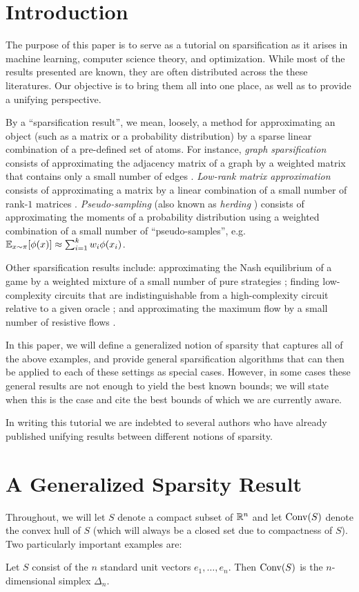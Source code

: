 \documentclass[paper.tex]{subfiles}
\begin{document}
\section{Introduction} 
\label{sec:intro}

The purpose of this paper is to serve as a tutorial on sparsification as it arises 
in machine learning, computer science theory, and optimization. While most of the 
results presented are known, they are often distributed across the these 
literatures. Our objective is to bring them all into one place, 
as well as to provide a unifying perspective.

By a ``sparsification result'', we mean, loosely, a method for approximating an 
object (such as a matrix or a probability distribution) by a sparse linear 
combination of a pre-defined set of atoms. For instance, \emph{graph 
sparsification} consists of approximating the adjacency matrix of a graph by a 
weighted matrix that contains only a small number of edges \cite{?}. 
\emph{Low-rank matrix approximation} consists of approximating a matrix by a 
linear combination of a small number of rank-$1$ matrices \cite{?}. 
\emph{Pseudo-sampling} (also known as \emph{herding} \cite{?}) consists of 
approximating the moments of a probability distribution using a weighted 
combination of a small number of ``pseudo-samples'', e.g. 
$\mathbb{E}_{x \sim \pi}[\phi(x)] \approx \sum_{i=1}^k w_i \phi(x_i)$.

Other sparsification results include:  approximating the 
Nash equilibrium of a game by a weighted mixture of a small number of pure 
strategies \cite{?}; finding low-complexity circuits that are indistinguishable 
from a high-complexity circuit relative to a given oracle \cite{?}; and 
approximating the maximum flow by a small number of resistive flows \cite{?}.

In this paper, we will define a generalized notion of sparsity that captures 
all of the above examples, and provide general sparsification algorithms that 
can then be applied to each of these settings as special cases. However, in some 
cases these general results are not enough to yield the best known bounds; we will 
state when this is the case and cite the best bounds of which we are currently 
aware.

In writing this tutorial we are indebted to several authors who have already 
published unifying results between different notions of sparsity. 

\section{A Generalized Sparsity Result}
Throughout, we will let $S$ denote a 
compact subset of $\mathbb{R}^n$ and let $\operatorname{Conv}(S)$ denote the convex hull of $S$ 
(which will always be a closed set due to compactness of $S$). Two particularly 
important examples are:
\begin{example}
\label{ex:simplex}
Let $S$ consist of the $n$ standard unit vectors $e_1, \ldots, e_n$. Then 
$\operatorname{Conv}(S)$ is the $n$-dimensional simplex $\Delta_n$.
\end{example}
\end{document}
